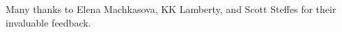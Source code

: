\documentclass{sig-alternate}
\begin{document}
Many thanks to Elena Machkasova, KK Lamberty, and Scott Steffes for their invaluable feedback. \\ \\


%
%
\end{document}
